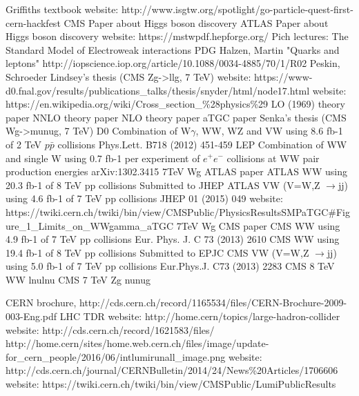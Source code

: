 \begin{thebibliography}{1}
 Griffiths textbook
 website: http://www.isgtw.org/spotlight/go-particle-quest-first-cern-hackfest
 CMS Paper about Higgs boson discovery
 ATLAS Paper about Higgs boson discovery
 website: https://mstwpdf.hepforge.org/
 Pich lectures: The Standard Model of Electroweak interactions
 PDG
 Halzen, Martin "Quarks and leptons"
 http://iopscience.iop.org/article/10.1088/0034-4885/70/1/R02
 Peskin, Schroeder
 Lindsey's thesis (CMS Zg->llg, 7 TeV)
 website: https://www-d0.fnal.gov/results/publications\_talks/thesis/snyder/html/node17.html
 website: https://en.wikipedia.org/wiki/Cross\_section\_\%28physics\%29
 LO (1969) theory paper
 NNLO theory paper
 NLO theory paper
 aTGC paper
 Senka's thesis (CMS Wg->munug, 7 TeV)
 D0 Combination of W$\gamma$, WW, WZ and VW using 8.6 fb-1 of 2 TeV $p\bar{p}$ collisions Phys.Lett. B718 (2012) 451-459 
 LEP Combination of WW and single W using 0.7 fb-1 per experiment of $e^+e^-$ collisions at WW pair production energies arXiv:1302.3415
 7TeV Wg ATLAS paper
 ATLAS WW using 20.3 fb-1 of 8 TeV pp collisions Submitted to JHEP
 ATLAS VW (V=W,Z $\rightarrow$jj) using 4.6 fb-1 of 7 TeV pp collisions JHEP 01 (2015) 049
 website: https://twiki.cern.ch/twiki/bin/view/CMSPublic/PhysicsResultsSMPaTGC\#Figure\_1\_Limits\_on\_WWgamma\_aTGC
 7TeV Wg CMS paper
 CMS WW using 4.9 fb-1 of 7 TeV pp collisions Eur. Phys. J. C 73 (2013) 2610
 CMS WW using 19.4 fb-1 of 8 TeV pp collisions Submitted to EPJC
 CMS VW (V=W,Z $\rightarrow$jj) using 5.0 fb-1 of 7 TeV pp collisions Eur.Phys.J. C73 (2013) 2283
 CMS 8 TeV WW lnulnu
 CMS 7 TeV Zg nunug



 CERN brochure, http://cds.cern.ch/record/1165534/files/CERN-Brochure-2009-003-Eng.pdf
 LHC TDR
 website: http://home.cern/topics/large-hadron-collider
 website: http://cds.cern.ch/record/1621583/files/
 http://home.cern/sites/home.web.cern.ch/files/image/update-for\_cern\_people/2016/06/intlumirunall\_image.png 
 website: http://cds.cern.ch/journal/CERNBulletin/2014/24/News\%20Articles/1706606
 website: https://twiki.cern.ch/twiki/bin/view/CMSPublic/LumiPublicResults


\end{thebibliography}
